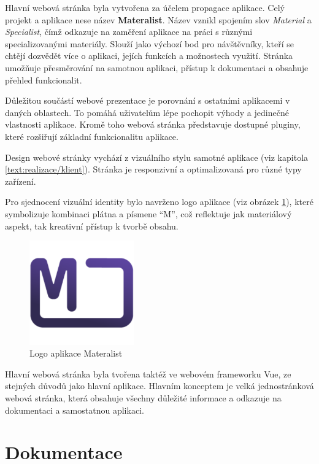 Hlavní webová stránka byla vytvořena za účelem propagace aplikace.
Celý projekt a aplikace nese název \textbf{Materalist}.
Název vznikl spojením slov \textit{Material} a \textit{Specialist}, čímž odkazuje na zaměření aplikace na práci s různými specializovanými materiály.
Slouží jako výchozí bod pro návštěvníky, kteří se chtějí dozvědět více o aplikaci, jejích funkcích a možnostech využití. 
Stránka umožňuje přesměrování na samotnou aplikaci, přístup k dokumentaci a obsahuje přehled funkcionalit.

Důležitou součástí webové prezentace je porovnání s ostatními aplikacemi v daných oblastech. 
To pomáhá uživatelům lépe pochopit výhody a jedinečné vlastnosti aplikace. 
Kromě toho webová stránka představuje dostupné pluginy, které rozšiřují základní funkcionalitu aplikace.

Design webové stránky vychází z vizuálního stylu samotné aplikace (viz kapitola \ref{text:realizace/klient}). 
Stránka je responzivní a optimalizovaná pro různé typy zařízení.

Pro sjednocení vizuální identity bylo navrženo logo aplikace (viz obrázek \ref{fig:logo}), které symbolizuje kombinaci plátna a písmene \enquote{M}, což reflektuje jak materiálový aspekt, tak kreativní přístup k tvorbě obsahu.

\begin{figure}[ht!]
    \centering
    \includegraphics[width=0.4\textwidth]{media/05_realizace/logo.png}
    \caption{Logo aplikace Materalist}
    \label{fig:logo}
\end{figure}

Hlavní webová stránka byla tvořena taktéž ve webovém frameworku Vue, ze stejných důvodů jako hlavní aplikace.
Hlavním konceptem je velká jednostránková webová stránka, která obsahuje všechny důležité informace a odkazuje na dokumentaci a samostatnou aplikaci.

\section{Dokumentace}

